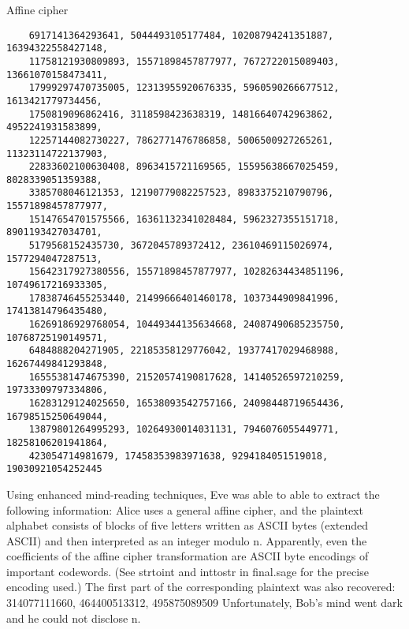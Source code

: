 \begin{problem}
  Affine cipher
  \begin{Verbatim}
    6917141364293641, 5044493105177484, 10208794241351887, 16394322558427148,
    11758121930809893, 15571898457877977, 7672722015089403, 13661070158473411,
    17999297470735005, 12313955920676335, 5960590266677512, 1613421779734456,
    1750819096862416, 3118598423638319, 14816640742963862, 4952241931583899,
    12257144082730227, 7862771476786858, 5006500927265261, 11323114722137903,
    22833602100630408, 8963415721169565, 15595638667025459, 8028339051359388,
    3385708046121353, 12190779082257523, 8983375210790796, 15571898457877977,
    15147654701575566, 16361132341028484, 5962327355151718, 8901193427034701,
    5179568152435730, 3672045789372412, 23610469115026974, 1577294047287513,
    15642317927380556, 15571898457877977, 10282634434851196, 10749617216933305,
    17838746455253440, 21499666401460178, 1037344909841996, 17413814796435480,
    16269186929768054, 10449344135634668, 24087490685235750, 10768725190149571,
    6484888204271905, 22185358129776042, 19377417029468988, 16267449841293848,
    16555381474675390, 21520574190817628, 14140526597210259, 19733309797334806,
    16283129124025650, 16538093542757166, 24098448719654436, 16798515250649044,
    13879801264995293, 10264930014031131, 7946076055449771, 18258106201941864,
    423054714981679, 17458353983971638, 9294184051519018, 19030921054252445
  \end{Verbatim}


  \noindent
  Using enhanced mind-reading techniques, Eve was able to able to extract the following
  information: Alice uses a general affine cipher, and the plaintext alphabet consists of blocks
  of five letters written as ASCII bytes (extended ASCII) and then interpreted as an integer
  modulo n. Apparently, even the coefficients of the affine cipher transformation are ASCII
  byte encodings of important codewords. (See strtoint and inttostr in final.sage for
  the precise encoding used.) The first part of the corresponding plaintext was also recovered:
  314077111660, 464400513312, 495875089509
  Unfortunately, Bob’s mind went dark and he could not disclose n.
\end{problem}

